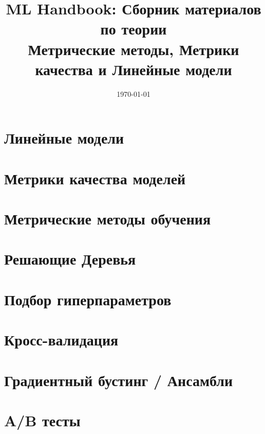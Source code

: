 \documentclass[12pt]{article}
\title{ML Handbook: Сборник материалов по теории\\ \large Метрические методы, Метрики качества и Линейные модели}
\date{\today}
\begin{document}
\maketitle
\tableofcontents
\newpage

\section{Линейные модели}



\newpage
\section{Метрики качества моделей}



\newpage
\section{Метрические методы обучения}


\newpage
\section{Решающие Деревья}


\newpage
\section{Подбор гиперпараметров}


\newpage
\section{Кросс-валидация}


\newpage
\section{Градиентный бустинг / Ансамбли}


\newpage
\section{A/B тесты}

\end{document}

